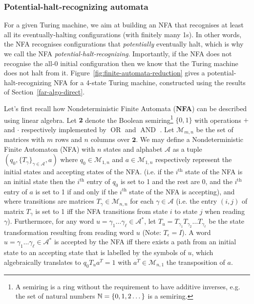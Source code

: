 
\subsubsection{Potential-halt-recognizing automata}
\newcommand{\M}{\mathcal{M}}
\newcommand{\T}{^T}
\newcommand{\row}{\text{row}}
\label{far-defs-recognizer}
For a given Turing machine, we aim at building an NFA that recognises at least all its eventually-halting configurations (with finitely many 1s). In other words, the NFA recognises configurations that \textit{potentially} eventually halt, which is why we call the NFA \textit{potential-halt-recognizing}. Importantly, if the NFA does not recognise the all-0 initial configuration then we know that the Turing machine does not halt from it. Figure~\ref{fig:finite-automata-reduction} gives a potential-halt-recognizing NFA for a 4-state Turing machine, constructed using the results of Section~\ref{far-algo-direct}.


Let's first recall how Nondeterministic Finite Automata (\textbf{NFA}) can be described using linear algebra. Let $\mathbf{2}$ denote the Boolean semiring\footnote{A semiring is a ring without the requirement to have additive inverses, e.g. the set of natural numbers $\mathbb{N}=\{0,1,2\dots\}$ is a semiring.} $\{0,1\}$ with operations $+$ and $\cdot$ respectively implemented by $\operatorname{OR}$ and $\operatorname{AND}$ \cite{CUNINGHAMEGREEN1991251}.
Let $\M_{m,n}$ be the set of matrices with $m$ rows and $n$ columns over $\mathbf{2}$. We may define a Nondeterministic Finite Automaton (NFA) with $n$ states and alphabet $\mathcal{A}$ as a tuple $(q_0, \{T_\gamma\}_{\gamma \in \mathcal{A}}, a)$ where $q_0 \in \M_{1,n}$ and $a \in \M_{1,n}$ respectively represent the initial states and accepting states of the NFA. (i.e. if the $i^\text{th}$ state of the NFA is an initial state then the $i^\text{th}$ entry of $q_0$ is set to 1 and the rest are 0, and the $i^\text{th}$ entry of $a$ is set to 1 if and only if the $i^\text{th}$ state of the NFA is accepting), and where transitions are matrices $T_\gamma\in \M_{n,n}$ for each $\gamma\in\mathcal{A}$ (i.e. the entry $(i,j)$ of matrix $T_\gamma$ is set to 1 iff the NFA transitions from state $i$ to state $j$ when reading $\gamma$). Furthermore, for any word $u=\gamma_1\dots\gamma_\ell \in \mathcal{A}^*$, let $T_u = T_{\gamma_1} T_{\gamma_2} \dots T_{\gamma_\ell}$ be the state transformation resulting from reading word $u$ (Note: $T_\epsilon = I$). A word $u=\gamma_1\dots\gamma_\ell \in \mathcal{A}^*$ is accepted by the NFA iff there exists a path from an initial state to an accepting state that is labelled by the symbols of $u$, which algebraically translates to $q_0 T_u a\T = 1$ with $a\T \in \M_{n,1}$ the transposition of $a$.



